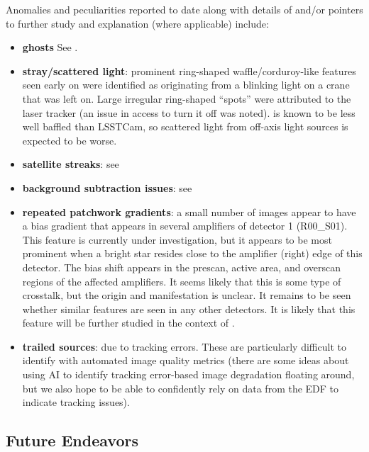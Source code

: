 Anomalies and peculiarities reported to date along with details of and/or pointers
to further study and explanation (where applicable) include:
\begin{itemize}

\item \textbf{ghosts} See .

\item \textbf{stray/scattered light}: prominent ring-shaped waffle/corduroy-like
  features seen early on were identified as originating from a blinking light on a
  crane that was left on. Large irregular ring-shaped ``spots'' were attributed to
  the laser tracker (an issue in access to turn it off was noted). \ComCam is 
  known to be less well baffled than LSSTCam, so scattered light from off-axis light 
  sources is expected to be worse.

\item \textbf{satellite streaks}: see 

\item \textbf{background subtraction issues}: see 

\item \textbf{repeated patchwork gradients}: a small number of images appear to have a 
  bias gradient that appears in several amplifiers of detector 1 (R00\_S01). This feature 
  is currently under investigation, but it appears to be most prominent when a bright star 
  resides close to the amplifier (right) edge of this detector. The bias shift appears in 
  the prescan, active area, and overscan regions of the affected amplifiers. It seems 
  likely that this is some type of crosstalk, but the origin and manifestation is unclear. 
  It remains to be seen whether similar features are seen in any other detectors. It is 
  likely that this feature will be further studied in the context of .

\item \textbf{trailed sources}: due to tracking errors.  These are particularly
  difficult to identify with automated image quality metrics (there are some ideas
  about using AI to identify tracking error-based image degradation floating around,
  but we also hope to be able to confidently rely on data from the EDF to indicate
  tracking issues).

\end{itemize}

\subsection{Future Endeavors}

